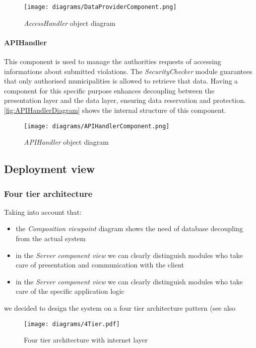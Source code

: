\begin{figure}[h!]
	\centering
	\texttt{[image: diagrams/DataProviderComponent.png]}
	\caption{
		\label{fig:accessHandlerComponentDiagram} 
		\emph{AccessHandler} object diagram
	}
\end{figure}

\clearpage
\paragraph{APIHandler}
This component is used to manage the authorities requests of accessing informations about submitted violations. The \textit{SecurityChecker} module guarantees that only authorised municipalities is allowed to retrieve that data. Having a component for this specific purpose enhances decoupling between the presentation layer and the data layer, ensuring data reservation and protection. \autoref{fig:APIHandlerDiagram} shows the internal structure of this component.\newline\newline
\begin{figure}[h!]
	\centering
	\texttt{[image: diagrams/APIHandlerComponent.png]}
	\caption{
		\label{fig:APIHandlerDiagram} 
		\emph{APIHandler} object diagram
	}
\end{figure}
		
\clearpage


\subsection{Deployment view}

\subsubsection{Four tier architecture}
Taking into account that:
\begin{itemize}
	\item the \emph{Composition viewpoint} diagram shows the need of database decoupling from the actual system
	\item in the \emph{Server component view} we can clearly distinguish modules who take care of presentation and communication with the client
	\item in the \emph{Server component view} we can clearly distinguish modules who take care of the specific application logic
\end{itemize}
we decided to design the system on a four tier architecture pattern (see also \label{sec:deploymentView}
\begin{figure}[h!]
	\centering
	\texttt{[image: diagrams/4Tier.pdf]}
	\caption{
		\label{fig:fourTierCloud} 
		Four tier architecture with internet layer
	}
\end{figure}
